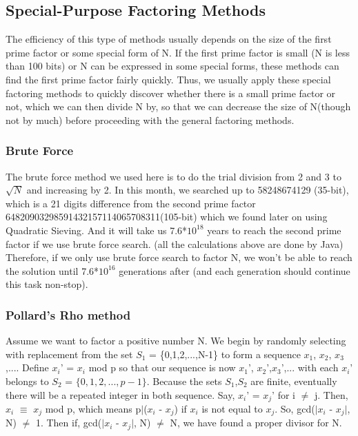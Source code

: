 \documentclass[12pt]{article} %
\begin{document}
	\subsection{Special-Purpose Factoring Methods}
	The efficiency of this type of methods usually depends on the size of the first prime factor or some special form of N. If the first prime factor is small (N is less than 100 bits) or N can be expressed in some special forms, these methods can find the first prime factor fairly quickly.
	Thus, we usually apply these special factoring methods to quickly discover whether there is a small prime factor or not, which we can then divide N by, so that we can decrease the size of N(though not by much) before proceeding with the general factoring methods.
	
	\subsubsection{ Brute Force}
	The brute force method we used here is to do the trial division from 2 and 3 to $\sqrt{N}$ and increasing by 2.
	In this month, we searched up to 58248674129 (35-bit), which is a 21 digits difference from the second prime factor 64820903298591432157114065708311(105-bit) which we found later on using Quadratic Sieving.
	And it will take us 7.6*$10^{18}$ years to reach the second prime factor if we use brute force search. (all the calculations above are done by Java) 
	Therefore, if we only use brute force search to factor N, we won't be able to reach the solution until 7.6*$10^{16}$ generations after (and each generation should continue this task non-stop).
	
	\subsubsection{Pollard's Rho method}
	Assume we want to factor a positive number N. We begin by randomly selecting with replacement from the set $S_1$ = \{0,1,2,...,N-1\} to form a sequence $x_1$, $x_2$, $x_3$,.... 
	Define $x_i$' = $x_i$ mod p so that our sequence is now $x_1$', $x_2$',$x_3$',... with each $x_i$' belongs to $S_2$ = $\{0,1,2,...,p-1\}$.
	Because the sets $S_1$,$S_2$ are finite, eventually there will be a repeated integer in both sequence. Say, $x_i$' = $x_j$' for i $\ne$ j. Then, $x_i$ $\equiv$ $x_j$ mod p, which means p$|$($x_i$ - $x_j$) if $x_i$ is not equal to $x_j$.
	So, gcd($|$$x_i$ - $x_j$$|$, N) $\ne$ 1. Then if, gcd($|$$x_i$ - $x_j$$|$, N) $\ne$ N, we have found a proper divisor for N.
	
\end{document}
